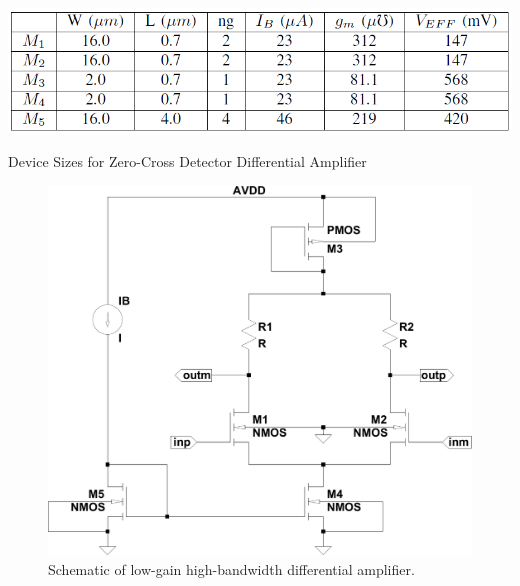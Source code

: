 \documentclass[12pt,oneside,final]{siuethesis}
\theoremstyle{definition}
\begin{document}
\begin{table}[htbp!]
 \centering
 \includegraphics[scale=.6,keepaspectratio=true]{./ch3_figures/zc_sizes.png}
 \caption{Device Sizes for Zero-Cross Detector Differential Amplifier}
 \label{tab:zcdiffamp}
\end{table}

\begin{figure}[htbp!]
	\centering
 	\includegraphics[scale=0.5,keepaspectratio=true]{../Design_Reports/CFD_circuit_report/images/zc_dm_amp.pdf}
 	\caption{Schematic of low-gain high-bandwidth differential amplifier.}
 	\label{fig:zcdiffamp}
\end{figure}
\end{document}

